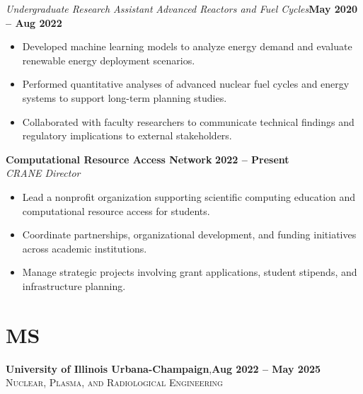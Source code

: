 \documentclass[margin,line]{resume}
\begin{document}
\begin{resume}
    \textsl{Undergraduate Research Assistant} \textsl{Advanced Reactors and Fuel Cycles}\hfill \textbf{May 2020 -- Aug 2022}\\
    \begin{itemize}
        \item Developed machine learning models to analyze energy demand and evaluate renewable energy deployment scenarios.
        \item Performed quantitative analyses of advanced nuclear fuel cycles and energy systems to support long-term planning studies.
        \item Collaborated with faculty researchers to communicate technical findings and regulatory implications to external stakeholders.
    \end{itemize}

    \textbf{Computational Resource Access Network} \hfill \textbf{2022 -- Present} \\
    \textsl{CRANE Director} \\
    \begin{itemize}
        \item Lead a nonprofit organization supporting scientific computing education and computational resource access for students.
        \item Coordinate partnerships, organizational development, and funding initiatives across academic institutions.
        \item Manage strategic projects involving grant applications, student stipends, and infrastructure planning.
    \end{itemize}

    \section{\mysidestyle MS}
    \textbf{University of Illinois Urbana-Champaign},\hfill\textbf{Aug 2022 -- May 2025}\\
    \textsc{Nuclear, Plasma, and Radiological Engineering}\\
    \vspace{-5.5mm}

\end{resume}
\end{document}
